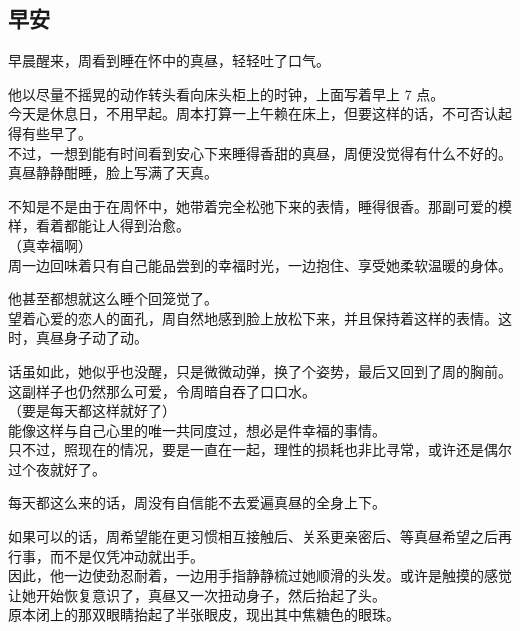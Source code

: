 \subsection{早安}

早晨醒来，周看到睡在怀中的真昼，轻轻吐了口气。

他以尽量不摇晃的动作转头看向床头柜上的时钟，上面写着早上 7 点。\\

今天是休息日，不用早起。周本打算一上午赖在床上，但要这样的话，不可否认起得有些早了。\\

不过，一想到能有时间看到安心下来睡得香甜的真昼，周便没觉得有什么不好的。\\

真昼静静酣睡，脸上写满了天真。

不知是不是由于在周怀中，她带着完全松弛下来的表情，睡得很香。那副可爱的模样，看着都能让人得到治愈。\\

（真幸福啊）\\

周一边回味着只有自己能品尝到的幸福时光，一边抱住、享受她柔软温暖的身体。

他甚至都想就这么睡个回笼觉了。\\

望着心爱的恋人的面孔，周自然地感到脸上放松下来，并且保持着这样的表情。这时，真昼身子动了动。

话虽如此，她似乎也没醒，只是微微动弹，换了个姿势，最后又回到了周的胸前。这副样子也仍然那么可爱，令周暗自吞了口口水。\\

（要是每天都这样就好了）\\

能像这样与自己心里的唯一共同度过，想必是件幸福的事情。\\

只不过，照现在的情况，要是一直在一起，理性的损耗也非比寻常，或许还是偶尔过个夜就好了。

每天都这么来的话，周没有自信能不去爱遍真昼的全身上下。

如果可以的话，周希望能在更习惯相互接触后、关系更亲密后、等真昼希望之后再行事，而不是仅凭冲动就出手。\\

因此，他一边使劲忍耐着，一边用手指静静梳过她顺滑的头发。或许是触摸的感觉让她开始恢复意识了，真昼又一次扭动身子，然后抬起了头。\\

原本闭上的那双眼睛抬起了半张眼皮，现出其中焦糖色的眼珠。\\

